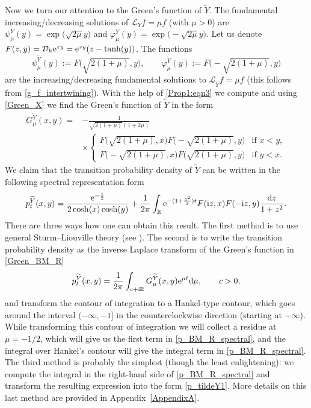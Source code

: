\documentclass[10pt,a4paper]{amsart}
\numberwithin{equation}{section}
\theoremstyle{definition}
\def\L{{\mathcal L}}
\def\r{{\mathbb R}}
\def\wr{{\textnormal{Wr}}}
\def\d{{\textnormal d}}
\def\i{{\textnormal i}}
\begin{document}
Now we turn our attention to the Green's function of $\widetilde Y$. The fundamental increasing/de\-creas\-ing solutions of $\L_Y f= \mu f$ (with $\mu>0$) are $\psi_{\mu}^Y(y)=\exp\bigl(\sqrt{2\mu} y\bigr)$ and
$\varphi_{\mu}^Y(y)=\exp\bigl(-\sqrt{2\mu} y\bigr)$. Let us denote
$
F(z,y)={\mathcal D}_h {\rm e}^{z y}={\rm e}^{zy} (z-\tanh(y))$.
The functions
\[
\psi_{\mu}^{\widetilde Y}(y):=F\bigl(\sqrt{2(1+\mu)},y\bigr), \qquad \varphi_{\mu}^{\widetilde Y}(y)
:=F\bigl(-\sqrt{2(1+\mu)},y\bigr)
\]
are the increasing/decreasing fundamental solutions to $\L_{\widetilde Y} f=\mu f$ (this follows from \eqref{g_f_intertwining}). With the help of
 \eqref{Prop1:eqn3} we compute \smash{$\wr\big[ \varphi_{\mu}^{\widetilde Y}; \psi_{\mu}^{\widetilde Y}\big]=-
2(1+2\mu)\sqrt{2(1+\mu)}$} and using \eqref{Green_X} we find the Green's function of $\widetilde Y$ in the form
\begin{align}
G^{\widetilde Y}_{\mu}(x,y)={}&-\frac{1}{\sqrt{2(1+\mu)}(1+2\mu)} \nonumber\\
&\times
\begin{cases}
F\bigl(\sqrt{2(1+\mu)},x\bigr) F\bigl(-\sqrt{2(1+\mu)},y\bigr)  &\text{if }  x<y,\\
F\bigl(-\sqrt{2(1+\mu)},x\bigr) F\bigl(\sqrt{2(1+\mu)},y\bigr)  &\text{if }  y<x.
\end{cases}\label{Green_BM_R}
\end{align}
We claim that the transition probability density of $\widetilde Y$ can be written in the following spectral representation form
\begin{equation}\label{p_BM_R_spectral}
 p^{\widetilde Y}_t(x,y)= \frac{{\rm e}^{-\frac{t}{2}}}{2\cosh(x) \cosh(y)} + \frac{1}{2\pi} \int_{\r} {\rm e}^{-(1+\frac{z^2}{2})t}
F(\i z,x) F(-\i z, y) \frac{\d z}{1+z^2}.
\end{equation}
There are three ways how one can obtain this result. The first method is to use general Sturm--Liouville theory (see \cite[Section 2.2]{sousa-yakubovich2022convolution}). The second is to write the transition probability density as the inverse Laplace transform of the Green's function in
\eqref{Green_BM_R}
\[
p^{\widetilde Y}_t(x,y)=\frac{1}{2\pi }
\int_{c+\i \r} G^{\widetilde Y}_{\mu}(x,y) {\rm e}^{\mu t} \d \mu, \qquad c>0,
\]
and transform the contour of integration to a Hankel-type contour, which goes around the interval $(-\infty,-1]$ in the counterclockwise direction (starting at $-\infty$). While transforming this contour of integration we will collect a residue at $\mu=-1/2$, which will give us the first term in \eqref{p_BM_R_spectral}, and the integral over Hankel's contour will give the integral term in \eqref{p_BM_R_spectral}. The third method is probably the simplest (though the least enlightening): we compute the integral in the right-hand side of \eqref{p_BM_R_spectral} and transform the resulting expression into the form
\eqref{p_tildeY1}. More details on this last method are provided in Appendix~\ref{AppendixA}.
\end{document}
